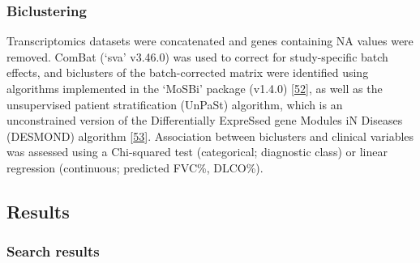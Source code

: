 \documentclass[
]{article}
\begin{document}
\hypertarget{biclustering}{%
\subsubsection{Biclustering}\label{biclustering}}

Transcriptomics datasets were concatenated and genes containing NA values were removed. ComBat (`sva' v3.46.0) was used to correct for study-specific batch effects, and biclusters of the batch-corrected matrix were identified using algorithms implemented in the `MoSBi' package (v1.4.0) {[}\protect\hyperlink{ref-rose_mosbi_2022}{52}{]}, as well as the unsupervised patient stratification (UnPaSt) algorithm, which is an unconstrained version of the Differentially ExpreSsed gene Modules iN Diseases (DESMOND) algorithm {[}\protect\hyperlink{ref-zolotareva_identification_2021}{53}{]}. Association between biclusters and clinical variables was assessed using a Chi-squared test (categorical; diagnostic class) or linear regression (continuous; predicted FVC\%, DLCO\%).

\hypertarget{results}{%
\subsection{Results}\label{results}}

\hypertarget{search-results}{%
\subsubsection{Search results}\label{search-results}}
\end{document}
